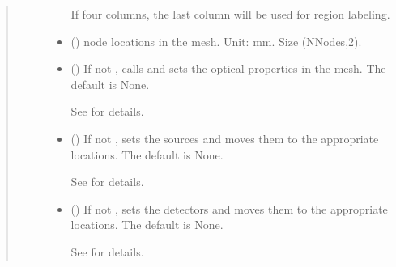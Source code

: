 \documentclass[letterpaper,10pt,english]{sphinxmanual}
\begin{document}
\begin{fulllineitems}
\begin{fulllineitems}
\begin{quote}
\begin{description}
\begin{itemize}
\sphinxAtStartPar
If four columns, the last column will be used for region labeling.


\item {} 
\sphinxAtStartPar
{} () \textendash{} node locations in the mesh. Unit: mm. Size (NNodes,2).

\item {} 
\sphinxAtStartPar
{} (\sphinxstyleliteralemphasis{\sphinxupquote{, }}) \textendash{} 
\sphinxAtStartPar
If not , calls  and sets the optical properties in the mesh. The default is None.

\sphinxAtStartPar
See {\hyperref[\detokenize{_autosummary/nirfasterff.base.dcs_mesh.dcsmesh:nirfasterff.base.dcs_mesh.dcsmesh.set_prop}]{}} for details.


\item {} 
\sphinxAtStartPar
{} (\sphinxstyleliteralemphasis{\sphinxupquote{, }}) \textendash{} 
\sphinxAtStartPar
If not , sets the sources and moves them to the appropriate locations. The default is None.

\sphinxAtStartPar
See {\hyperref[\detokenize{_autosummary/nirfasterff.base.optodes.optode:nirfasterff.base.optodes.optode.touch_sources}]{}} for details.


\item {} 
\sphinxAtStartPar
{} (\sphinxstyleliteralemphasis{\sphinxupquote{, }}) \textendash{} 
\sphinxAtStartPar
If not , sets the detectors and moves them to the appropriate locations. The default is None.

\sphinxAtStartPar
See {\hyperref[\detokenize{_autosummary/nirfasterff.base.optodes.optode:nirfasterff.base.optodes.optode.touch_detectors}]{}} for details.



\end{itemize}
\end{description}
\end{quote}
\end{fulllineitems}
\end{fulllineitems}
\end{document}
